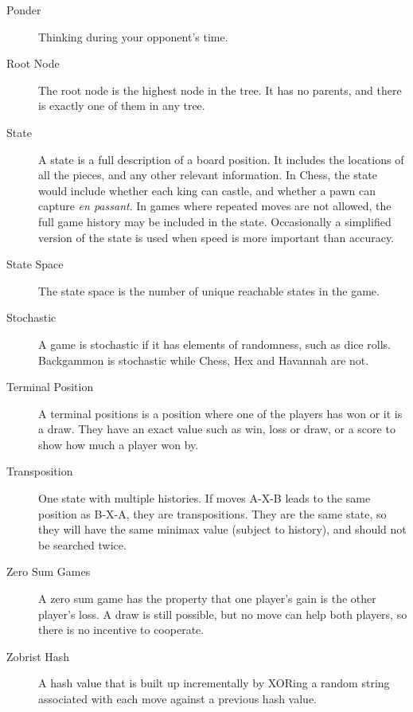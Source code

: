 \begin{description}
\item[Ponder] Thinking during your opponent's time.
\item[Root Node] The root node is the highest node in the tree. It has no parents, and there is exactly one of them in any tree.
\item[State] A state is a full description of a board position. It includes the locations of all the pieces, and any other relevant information. In Chess, the state would include whether each king can castle, and whether a pawn can capture \textit{en passant}. In games where repeated moves are not allowed, the full game history may be included in the state. Occasionally a simplified version of the state is used when speed is more important than accuracy.
\item[State Space] The state space is the number of unique reachable states in the game.
\item[Stochastic] A game is stochastic if it has elements of randomness, such as dice rolls. Backgammon is stochastic while Chess, Hex and Havannah are not.
\item[Terminal Position] A terminal positions is a position where one of the players has won or it is a draw. They have an exact value such as win, loss or draw, or a score to show how much a player won by.
\item[Transposition] One state with multiple histories. If moves A-X-B leads to the same position as B-X-A, they are transpositions. They are the same state, so they will have the same minimax value (subject to history), and should not be searched twice.
\item[Zero Sum Games] A zero sum game has the property that one player's gain is the other player's loss. A draw is still possible, but no move can help both players, so there is no incentive to cooperate.
\item[Zobrist Hash] A hash value that is built up incrementally by XORing a random string associated with each move against a previous hash value.

\end{description}


